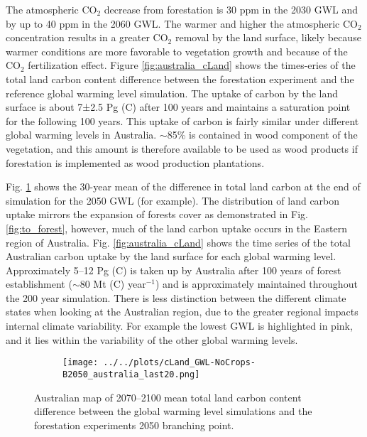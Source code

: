 \documentclass[]{article}
\begin{document}
The atmospheric CO$_2$ decrease from forestation is 30 ppm in the 2030 GWL and by up to 40 ppm in the 2060 GWL.
The warmer and higher the atmospheric CO$_2$ concentration results in a greater CO$_2$ removal by the land surface, likely because warmer conditions are more favorable to vegetation growth and because of the CO$_2$ fertilization effect.
Figure \ref{fig:australia_cLand} shows the times-eries of the total land carbon content difference between the forestation experiment and the reference global warming level simulation.
The uptake of carbon by the land surface is about 7±2.5 Pg (C) after 100 years and maintains a saturation point for the following 100 years.
This uptake of carbon is fairly similar under different global warming levels in Australia.
$\sim$85\% is contained in wood component of the vegetation, and this amount is therefore available to be used as wood products if forestation is implemented as wood production plantations.

Fig. \ref{fig:aus_map_cLand} shows the 30-year mean of the difference in total land carbon at the end of simulation for the 2050 GWL (for example).
The distribution of land carbon uptake mirrors the expansion of forests cover as demonstrated in Fig. \ref{fig:to_forest}, however, much of the land carbon uptake occurs in the Eastern region of Australia.
Fig. \ref{fig:australia_cLand} shows the time series of the total Australian carbon uptake by the land surface for each global warming level.
Approximately 5–12 Pg (C) is taken up by Australia after 100 years of forest establishment ($\sim$80 Mt (C) year$^{-1}$) and is approximately maintained throughout the 200 year simulation.
There is less distinction between the different climate states when looking at the Australian region, due to the greater regional impacts internal climate variability.
For example the lowest GWL is highlighted in pink, and it lies within the variability of the other global warming levels.

\begin{figure}[H]
    \centering
    \begin{subfigure}[b]{\linewidth}
        \texttt{[image: ../../plots/cLand\_GWL-NoCrops-B2050\_australia\_last20.png]}
    \end{subfigure}
    \caption{Australian map of 2070--2100 mean total land carbon content difference between the global warming level simulations and the forestation experiments 2050 branching point.}
    \label{fig:aus_map_cLand}
\end{figure}
\end{document}
